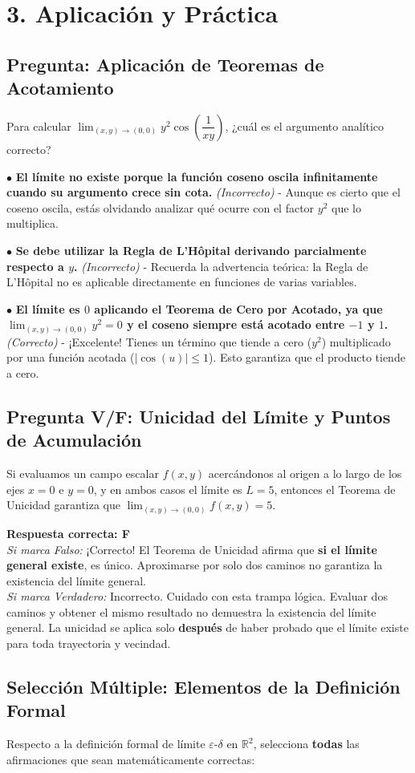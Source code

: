 \documentclass[11pt]{article}
\newenvironment{aplicacion}{%
  \section*{3. Aplicación y Práctica}%
}{}
\newenvironment{preguntaalternativas}[1]{\subsection*{Pregunta: #1}\par\vspace{0.1cm}}{\vspace{0.3cm}}
\newcommand{\opcion}[3]{\par\noindent $\bullet$ \textbf{#1} \textit{(#2)} - #3\par\vspace{0.15cm}}
\newenvironment{preguntaverdaderofalso}[1]{\subsection*{Pregunta V/F: #1}\par\vspace{0.1cm}}{\vspace{0.3cm}}
\newcommand{\verdaderofalso}[3]{\par\noindent\textbf{Respuesta correcta: #1} \\ \textit{Si marca Falso:} #2 \\ \textit{Si marca Verdadero:} #3\par\vspace{0.15cm}}
\newenvironment{preguntacasillas}[1]{\subsection*{Selección Múltiple: #1}\par\vspace{0.1cm}}{\vspace{0.3cm}}
\begin{document}
\begin{aplicacion}
  \begin{preguntaalternativas}{Aplicación de Teoremas de Acotamiento}
    Para calcular $\displaystyle \lim_{(x,y) \to (0,0)} y^2 \cos\left(\dfrac{1}{xy}\right)$, ¿cuál es el argumento analítico correcto?
    
    \opcion{El límite no existe porque la función coseno oscila infinitamente cuando su argumento crece sin cota.}{Incorrecto}{Aunque es cierto que el coseno oscila, estás olvidando analizar qué ocurre con el factor $y^2$ que lo multiplica.}
    \opcion{Se debe utilizar la Regla de L'Hôpital derivando parcialmente respecto a $y$.}{Incorrecto}{Recuerda la advertencia teórica: la Regla de L'Hôpital no es aplicable directamente en funciones de varias variables.}
    \opcion{El límite es $0$ aplicando el Teorema de Cero por Acotado, ya que $\displaystyle \lim_{(x,y)\to(0,0)} y^2 = 0$ y el coseno siempre está acotado entre $-1$ y $1$.}{Correcto}{¡Excelente! Tienes un término que tiende a cero ($y^2$) multiplicado por una función acotada ($|\cos(u)| \leq 1$). Esto garantiza que el producto tiende a cero.}
  \end{preguntaalternativas}

  \begin{preguntaverdaderofalso}{Unicidad del Límite y Puntos de Acumulación}
    Si evaluamos un campo escalar $f(x,y)$ acercándonos al origen a lo largo de los ejes $x=0$ e $y=0$, y en ambos casos el límite es $L=5$, entonces el Teorema de Unicidad garantiza que $\displaystyle \lim_{(x,y) \to (0,0)} f(x,y) = 5$.
    
    \verdaderofalso{F}
      {¡Correcto! El Teorema de Unicidad afirma que \textbf{si el límite general existe}, es único. Aproximarse por solo dos caminos no garantiza la existencia del límite general.}
      {Incorrecto. Cuidado con esta trampa lógica. Evaluar dos caminos y obtener el mismo resultado no demuestra la existencia del límite general. La unicidad se aplica solo \textbf{después} de haber probado que el límite existe para toda trayectoria y vecindad.}
  \end{preguntaverdaderofalso}

  \begin{preguntacasillas}{Elementos de la Definición Formal}
    Respecto a la definición formal de límite $\varepsilon$-$\delta$ en $\mathbb{R}^2$, selecciona \textbf{todas} las afirmaciones que sean matemáticamente correctas:
    

\end{preguntacasillas}
\end{aplicacion}
\end{document}
